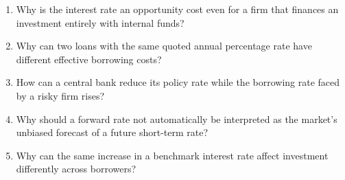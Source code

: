 

\begin{enumerate}

\item Why is the interest rate an opportunity cost even for a firm that finances an investment entirely with internal funds?

\item Why can two loans with the same quoted annual percentage rate have different effective borrowing costs?

\item How can a central bank reduce its policy rate while the borrowing rate faced by a risky firm rises?

\item Why should a forward rate not automatically be interpreted as the market's unbiased forecast of a future short-term rate?

\item Why can the same increase in a benchmark interest rate affect investment differently across borrowers?

\end{enumerate}



